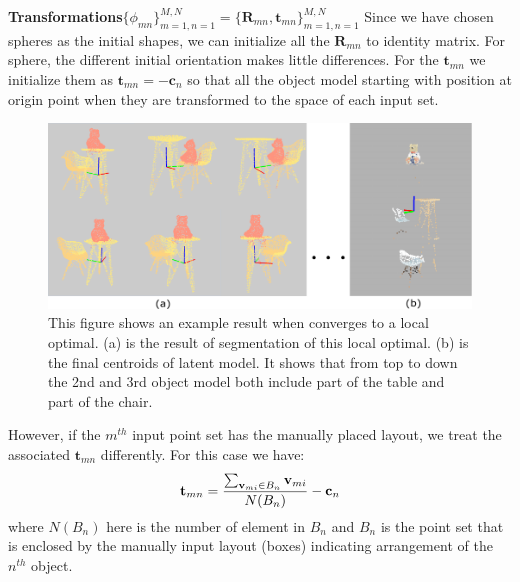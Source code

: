 \noindent\textbf{Transformations$\{\phi_{mn}\}_{m=1,n=1}^{M,N}=\{\mathbf{R}_{mn},\mathbf{t}_{mn}\}_{m=1,n=1}^{M,N}$}
Since we have chosen spheres as the initial shapes, we can initialize all the $\mathbf{R}_{mn}$ to identity matrix. For sphere, the different initial orientation makes little differences.
%
For the $\mathbf{t}_{mn}$ we initialize them as $\mathbf{t}_{mn}=- \mathbf{c}_n$ so that all the object model starting with position at origin point when they are transformed to the space of each input set. 
\begin{figure}
	\centering
	\includegraphics[width=\linewidth]{images/localoptimal/localoptimal}
	\caption{\label{fig:localoptimal}This figure shows an example result when converges to a local optimal. (a) is the result of segmentation of this local optimal. (b) is the final centroids of latent model. It shows that from top to down the 2nd and 3rd object model both include part of the table and part of the chair.}
\end{figure}
However, if the $m^{th}$ input point set has the manually placed layout, we treat the associated $\mathbf{t}_{mn}$ differently. For this case we have:
\begin{equation}
	\label{equ:initt}
	\mathbf{t}_{mn}=\frac{\sum_{\mathbf{v}_{mi} \in B_n}\mathbf{v}_{mi}}{N(B_n)}-\mathbf{c}_n
\end{equation}
where $N(B_n)$ here is the number of element in $B_n$ and $B_n$ is the point set that is enclosed by the manually input layout (boxes) indicating arrangement of the $n^{th}$ object.
